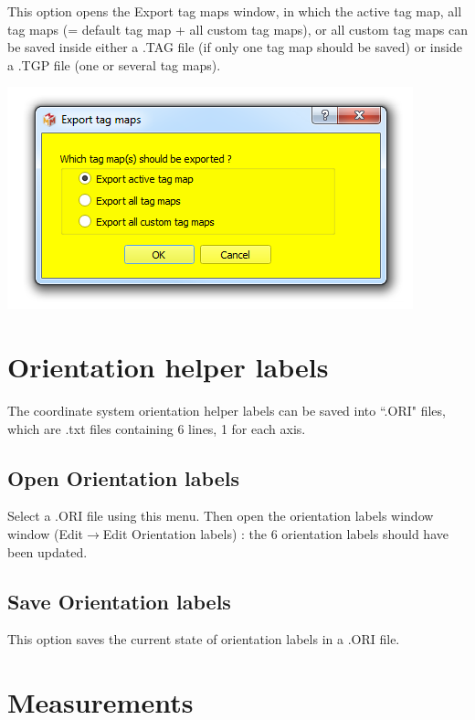 \begin{minipage}{0.55\textwidth}
This option opens the Export tag maps window, in which the active tag map, all tag maps (= default tag map + all custom tag maps), or all custom tag maps can be saved inside either a .TAG file (if only one tag map should be saved) or inside a .TGP file (one or several tag maps).


\end{minipage}  
 \begin{minipage}{0.45\textwidth}\centering
  \includegraphics[scale=0.5]{images/07/tagmaps/export.png}
 \end{minipage} 

\section{Orientation helper labels}
The coordinate system orientation helper labels can be saved into ``.ORI" files, which are .txt files
containing 6 lines, 1 for each axis.


\subsection{Open Orientation labels}
Select a .ORI file using this menu.  Then open the orientation labels window window (Edit$\rightarrow$Edit 
Orientation labels) : the 6 orientation labels should have been updated.

\subsection{Save Orientation labels}
This option saves the current state of orientation labels in a .ORI file.

\section{Measurements}
